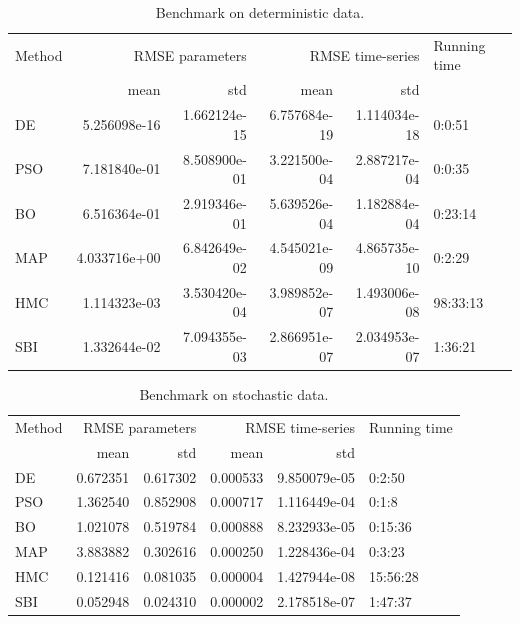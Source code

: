 \documentclass[preprint,11pt,authoryear]{elsarticle}
\begin{document}
\clearpage

\begin{table}[p]
    \centering
    \begin{tabular}{lrrrrl}
    {Method} & \multicolumn{2}{r}{RMSE parameters} & \multicolumn{2}{r}{RMSE time-series} & Running time \\
    {} &            mean &           std &             mean & std \\
    \midrule
    DE     &    5.256098e-16 &  1.662124e-15 &     6.757684e-19 &  1.114034e-18 &       0:0:51 \\
    PSO    &    7.181840e-01 &  8.508900e-01 &     3.221500e-04 &  2.887217e-04 &       0:0:35 \\
    BO     &    6.516364e-01 &  2.919346e-01 &     5.639526e-04 &  1.182884e-04 &      0:23:14 \\
    MAP    &    4.033716e+00 &  6.842649e-02 &     4.545021e-09 &  4.865735e-10 &       0:2:29 \\
    HMC    &    1.114323e-03 &  3.530420e-04 &     3.989852e-07 &  1.493006e-08 &     98:33:13 \\
    SBI    &    1.332644e-02 &  7.094355e-03 &     2.866951e-07 &  2.034953e-07 &      1:36:21 \\
    \end{tabular}
\caption{Benchmark on deterministic data.}
\label{tab:ODEdata}
\end{table}




\begin{table}[p]
    \centering
    \begin{tabular}{lrrrrl}
    {Method} & \multicolumn{2}{r}{RMSE parameters} & \multicolumn{2}{r}{RMSE time-series} & Running time \\
    {} &            mean &       std &             mean & std \\
    \midrule
    DE     &        0.672351 &  0.617302 &         0.000533 &  9.850079e-05 &       0:2:50 \\
    PSO    &        1.362540 &  0.852908 &         0.000717 &  1.116449e-04 &        0:1:8 \\
    BO     &        1.021078 &  0.519784 &         0.000888 &  8.232933e-05 &      0:15:36 \\
    MAP    &        3.883882 &  0.302616 &         0.000250 &  1.228436e-04 &       0:3:23 \\
    HMC    &        0.121416 &  0.081035 &         0.000004 &  1.427944e-08 &     15:56:28 \\
    SBI    &        0.052948 &  0.024310 &         0.000002 &  2.178518e-07 &      1:47:37 \\
\end{tabular}
\caption{Benchmark on stochastic data.}
\label{tab:SDEdata}
\end{table}
\end{document}

